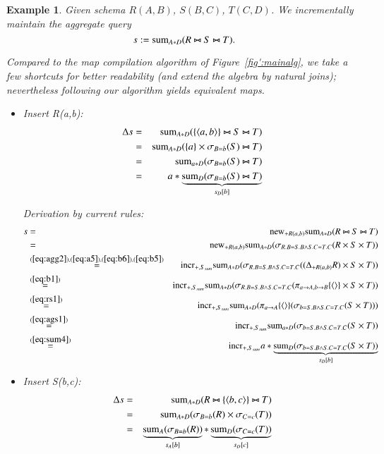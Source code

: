 \documentclass{article}
\newtheorem{example}[theorem]{Example}
\newcommand{\tuple}[1]{{\langle#1\rangle}}
\begin{document}
\begin{example}\em
Given schema $R(A,B)$, $S(B,C)$, $T(C,D)$.
We incrementally maintain the aggregate query
\[
s := \mathrm{sum}_{A*D}(R \bowtie S \bowtie T).
\]

Compared to the map compilation algorithm of Figure~\ref{fig':mainalg}, we take a
few shortcuts for better readability (and extend the algebra by natural joins);
nevertheless following our algorithm yields equivalent maps. 
\begin{itemize}
\item
Insert R(a,b):
\begin{eqnarray*}
\Delta s &=& \algsum_{A*D}(\{\tuple{a,b}\} \bowtie S \bowtie T)
\\ &=&
\algsum_{A*D}(\{a\} \times \sigma_{B=b}(S) \bowtie T)
\\ &=&
\algsum_{a*D}(\sigma_{B=b}(S) \bowtie T)	
\\ &=&
a * \underbrace{\algsum_{D}(\sigma_{B=b}(S) \bowtie T)}_{s_D[b]}
\end{eqnarray*}

Derivation by current rules:
\begin{eqnarray*}
s &=& \algnew_{+R(a,b)} \algsum_{A*D}(R \bowtie S \bowtie T)
\\
&=& \algnew_{+R(a,b)}
 \algsum_{A*D}(\sigma_{R.B=S.B \wedge S.C=T.C}(R \times S \times T))
\\
&\stackrel{(\ref{eq:agg2}), (\ref{eq:a5}), (\ref{eq:b6}), (\ref{eq:b5})}{=}&
\algincr_{+,S_{sum}} \algsum_{A*D}
(\sigma_{R.B=S.B \wedge S.C=T.C}((\Delta_{+R(a,b)} R) \times S \times T))
\\
&\stackrel{(\ref{eq:b1})}{=}&
\algincr_{+,S_{sum}} \algsum_{A*D}
(\sigma_{R.B=S.B \wedge S.C=T.C}(
\pi_{a\rightarrow A, b\rightarrow B} \{\tuple{}\} \times S \times T))
\\
&\stackrel{(\ref{eq:rs1})}{=}& \algincr_{+,S_{sum}} \algsum_{A*D}
(\pi_{a \rightarrow A}\{\tuple{}\}(\sigma_{b=S.B \wedge S.C=T.C}(S \times T)))
\\
&\stackrel{(\ref{eq:ags1})}{=}&
\algincr_{+,S_{sum}} \algsum_{a*D}
(\sigma_{b=S.B \wedge S.C=T.C}(S \times T))
\\
&\stackrel{(\ref{eq:sum4})}{=}&
\algincr_{+,S_{sum}} a*
\underbrace{\algsum_{D}(\sigma_{b=S.B \wedge S.C=T.C}(S \times T))}_{s_D[b]}
\end{eqnarray*}

\item
Insert S(b,c):
\begin{eqnarray*}
\Delta s &=& \algsum_{A*D}(R \bowtie \{\tuple{b,c}\} \bowtie T)
\\ &=&
\algsum_{A*D}(\sigma_{B=b}(R) \times \sigma_{C=c}(T))
\\ &=&
\underbrace{\algsum_{A}(\sigma_{B=b}(R))}_{s_A[b]} *
\underbrace{\algsum_{D}(\sigma_{C=c}(T))}_{s_D[c]}
\end{eqnarray*}


\end{itemize}
\end{example}
\end{document}
